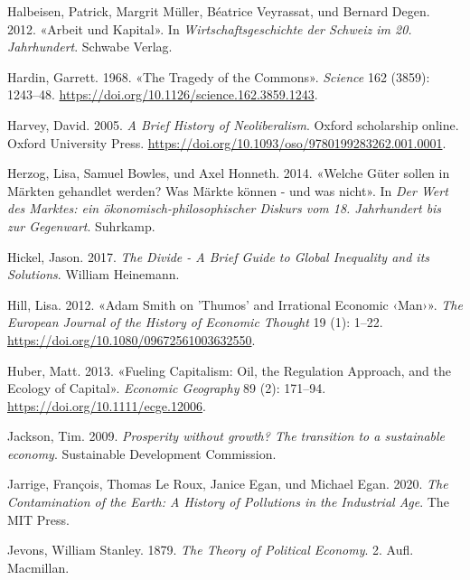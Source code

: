 \documentclass[
  nswissgerman,
  a4paper,
  DIV=11,
  numbers=noendperiod,
  oneside,
  openany]{scrreprt}
\newlength{\cslhangindent}
\newenvironment{CSLReferences}[2] %
 {\begin{list}{}{%
  \setlength{\itemindent}{0pt}
  \setlength{\leftmargin}{0pt}
  \setlength{\parsep}{0pt}
  \ifodd #1
   \setlength{\leftmargin}{\cslhangindent}
   \setlength{\itemindent}{-1\cslhangindent}
  \fi
  \setlength{\itemsep}{#2\baselineskip}}}
 {\end{list}}
\begin{document}
\begin{CSLReferences}{1}{1}
Halbeisen, Patrick, Margrit Müller, Béatrice Veyrassat, und Bernard
Degen. 2012. {«Arbeit und Kapital»}. In \emph{Wirtschaftsgeschichte der
Schweiz im 20. Jahrhundert}. Schwabe Verlag.

Hardin, Garrett. 1968. {«The Tragedy of the Commons»}. \emph{Science}
162 (3859): 1243--48.
\url{https://doi.org/10.1126/science.162.3859.1243}.

Harvey, David. 2005. \emph{A {Brief} {History} of {Neoliberalism}}.
Oxford scholarship online. Oxford University Press.
\url{https://doi.org/10.1093/oso/9780199283262.001.0001}.

Herzog, Lisa, Samuel Bowles, und Axel Honneth. 2014. {«Welche Güter
sollen in Märkten gehandlet werden? Was Märkte können - und was nicht»}.
In \emph{Der Wert des Marktes: ein ökonomisch-philosophischer Diskurs
vom 18. Jahrhundert bis zur Gegenwart}. Suhrkamp.

Hickel, Jason. 2017. \emph{The Divide - A Brief Guide to Global
Inequality and its Solutions}. William Heinemann.

Hill, Lisa. 2012. {«Adam Smith on 'Thumos' and Irrational Economic
{‹Man›}»}. \emph{The European Journal of the History of Economic
Thought} 19 (1): 1--22. \url{https://doi.org/10.1080/09672561003632550}.

Huber, Matt. 2013. {«Fueling Capitalism: Oil, the Regulation Approach,
and the Ecology of Capital»}. \emph{Economic Geography} 89 (2): 171--94.
\url{https://doi.org/10.1111/ecge.12006}.

Jackson, Tim. 2009. \emph{Prosperity without growth? {The} transition to
a sustainable economy}. Sustainable Development Commission.

Jarrige, François, Thomas Le Roux, Janice Egan, und Michael Egan. 2020.
\emph{The Contamination of the Earth: A History of Pollutions in the
Industrial Age}. The MIT Press.

Jevons, William Stanley. 1879. \emph{The Theory of Political Economy}.
2. Aufl. Macmillan.


\end{CSLReferences}
\end{document}
